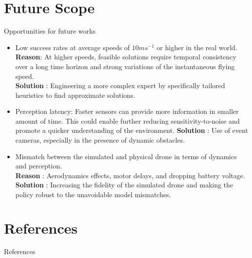 \documentclass{beamer}
\begin{document}
\section{Future Scope}
\begin{frame}[allowframebreaks]{Opportunities for future works}
	\begin{itemize}
		\item Low success rates at average speeds of $10 ms^{-1}$ or higher in the real world. \\
		\textbf{Reason}: At higher speeds, feasible solutions require temporal consistency over a long time horizon and strong variations of the instantaneous flying speed.\\
		\textbf{Solution} : Engineering a more complex expert by specifically tailored heuristics to find approximate solutions. 
		
		\item Perception latency: Faster sensors can provide more information in smaller amount of time. This could enable further reducing sensitivity-to-noise and promote a quicker understanding of the environment. 
		\textbf{Solution} : Use of event cameras, especially in the presence of dynamic obstacles.
		
		\item Mismatch between the simulated and physical drone in terms of dynamics and perception. \\
		\textbf{Reason} : Aerodynamics effects, motor delays, and dropping battery voltage. \\
		\textbf{Solution} : Increasing the fidelity of the simulated drone and making the policy robust to the unavoidable model mismatches.		
	\end{itemize}
	
\end{frame}

\section{References}
\begin{frame}[allowframebreaks]{References}
	\printbibliography
\end{frame}
\end{document}
